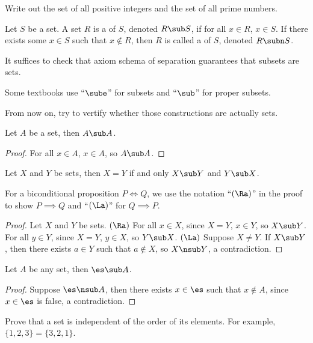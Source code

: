 \documentclass[10pt]{article}
\begin{document}
\begin{problem}
    Write out the set of all positive integers and the set of all prime numbers.
\end{problem}
\begin{definition}
    Let $S$ be a set. A set $R$ is a  of $S$, denoted $R\sub S$, if for all $x\in R$, $x\in S$. If there exists some $x\in S$ such that $x\notin R$, then $R$ is called a  of $S$, denoted $R\subn S$.
\end{definition}
\par
It suffices to check that axiom schema of separation guarantees that subsets are sets.
\begin{remark}
    Some textbooks use ``$\sube$'' for subsets and ``$\sub$'' for proper subsets.
\end{remark}
\begin{remark}
    From now on, try to vertify whether those constructions are actually sets.
\end{remark}
\begin{proposition}
    Let $A$ be a set, then $A\sub A$.
\end{proposition}
\begin{proof}
    For all $x\in A$, $x\in A$, so $A\sub A$. 
\end{proof}
\begin{proposition}
    Let $X$ and $Y$ be sets, then $X=Y$ if and only $X\sub Y$ and $Y\sub X$.
\end{proposition}
\begin{remark}
    For a biconditional proposition $P\iff Q$, we use the notation ``$(\Ra)$'' in the proof to show $P\implies Q$ and ``$(\La)$'' for $Q\implies P$.
\end{remark}
\begin{proof}
    Let $X$ and $Y$ be sets. $(\Ra)$ For all $x\in X$, since $X=Y$, $x\in Y$, so $X\sub Y$. For all $y\in Y$, since $X=Y$, $y\in X$, so $Y\sub X$. $(\La)$ Suppose $X\ne Y$. If $X\sub Y$, then there exists $a\in Y$ such that $a\notin X$, so $X\nsub Y$, a contradiction.
\end{proof}
\begin{proposition}
    Let $A$ be any set, then $\es\sub A$.
\end{proposition}
\begin{proof}
    Suppose $\es\nsub A$, then there exists $x\in\es$ such that $x\notin A$, since $x\in\es$ is false, a contradiction.
\end{proof}
\begin{problem}
    Prove that a set is independent of the order of its elements. For example, $\{1,2,3\}=\{3,2,1\}$.
\end{problem}
\end{document}
